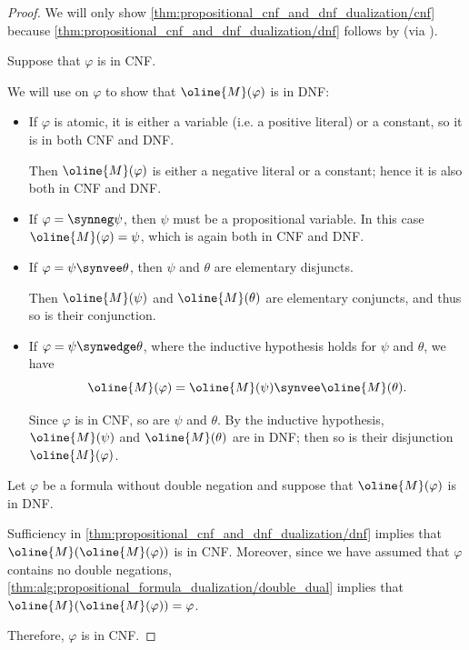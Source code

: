 \begin{proof}
  We will only show \cref{thm:propositional_cnf_and_dnf_dualization/cnf} because \cref{thm:propositional_cnf_and_dnf_dualization/dnf} follows by  (via ).

  \SufficiencySubProof Suppose that \( \varphi \) is in CNF.

  We will use  on \( \varphi \) to show that \( \oline{M}(\varphi) \) is in DNF:
  \begin{itemize}
    \item If \( \varphi \) is atomic, it is either a variable (i.e. a positive literal) or a constant, so it is in both CNF and DNF.

    Then \( \oline{M}(\varphi) \) is either a negative literal or a constant; hence it is also both in CNF and DNF.

    \item If \( \varphi = \synneg \psi \), then \( \psi \) must be a propositional variable. In this case \( \oline{M}(\varphi) = \psi \), which is again both in CNF and DNF.

    \item If \( \varphi = \psi \synvee \theta \), then \( \psi \) and \( \theta \) are elementary disjuncts.

    Then \( \oline{M}(\psi) \) and \( \oline{M}(\theta) \) are elementary conjuncts, and thus so is their conjunction.

    \item If \( \varphi = \psi \synwedge \theta \), where the inductive hypothesis holds for \( \psi \) and \( \theta \), we have
    \begin{equation*}
      \oline{M}(\varphi) = \oline{M}(\psi) \synvee \oline{M}(\theta).
    \end{equation*}

    Since \( \varphi \) is in CNF, so are \( \psi \) and \( \theta \). By the inductive hypothesis, \( \oline{M}(\psi) \) and \( \oline{M}(\theta) \) are in DNF; then so is their disjunction \( \oline{M}(\varphi) \).
  \end{itemize}

  \NecessitySubProof Let \( \varphi \) be a formula without double negation and suppose that \( \oline{M}(\varphi) \) is in DNF.

  Sufficiency in \cref{thm:propositional_cnf_and_dnf_dualization/dnf} implies that \( \oline{M}(\oline{M}(\varphi)) \) is in CNF. Moreover, since we have assumed that \( \varphi \) contains no double negations, \cref{thm:alg:propositional_formula_dualization/double_dual} implies that \( \oline{M}(\oline{M}(\varphi)) = \varphi \).

  Therefore, \( \varphi \) is in CNF.
\end{proof}

